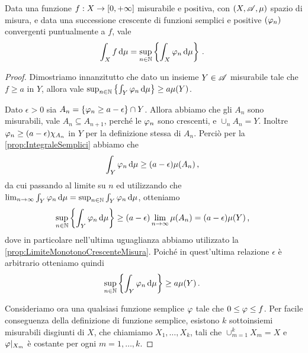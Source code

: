 \begin{proposition} \label{prop:DefinizioneEquivalenteIntegralePositive}
	Data una funzione $f:X\to[0,+\infty]$ misurabile e positiva, con $(X,\mathscr A,\mu)$ spazio di misura, e data una successione crescente di funzioni semplici e positive $(\varphi_n)$ convergenti puntualmente a $f$, vale 
	\begin{equation*}
		\int_X f\,\mathrm d\mu=\sup_{n\in\mathbb N}\left\{\int_X\varphi_n\,\mathrm d\mu\right\}\, \text{. }
	\end{equation*}
\end{proposition}
\begin{proof}
	Dimostriamo innanzitutto che dato un insieme $Y\in \mathscr A$ misurabile tale che $f\ge a$ in $Y$, allora vale $\sup_{n\in\mathbb N}\left\{\int_Y\varphi_n\,\mathrm d\mu\right\}\ge a\mu(Y)$.
	
	Dato $\epsilon>0$ sia $A_n=\{\varphi_n\ge a-\epsilon\}\cap Y$. Allora abbiamo che gli $A_n$ sono misurabili, vale $A_n\subseteq A_{n+1}$, perché le $\varphi_n$ sono crescenti, e $\cup_nA_n=Y$. Inoltre $\varphi_n\ge (a-\epsilon)\chi_{A_n}$ in $Y$ per la definizione stessa di $A_n$. Perciò per la \cref{prop:IntegraleSemplici} abbiamo che
	\begin{equation*}
		\int_Y\varphi_n\,\mathrm d\mu\ge(a-\epsilon)\mu(A_n)\, \text{, }
	\end{equation*}
	da cui passando al limite su $n$ ed utilizzando che $\lim_{n\to\infty}\int_Y\varphi_n\,\mathrm d\mu=\sup_{n\in\mathbb N}\int_Y\varphi_n\,\mathrm d\mu$, otteniamo
	\begin{equation*}
		\sup_{n\in\mathbb N}\left\{\int_Y\varphi_n\,\mathrm d\mu\right\}\ge(a-\epsilon)\lim_{n\to\infty}\mu(A_n)=(a-\epsilon)\mu(Y)\, \text{, }
	\end{equation*}
	dove in particolare nell'ultima uguaglianza abbiamo utilizzato la \cref{prop:LimiteMonotonoCrescenteMisura}. Poiché in quest'ultima relazione $\epsilon$ è arbitrario otteniamo quindi
	\begin{equation*}
		\sup_{n\in\mathbb N}\left\{\int_Y\varphi_n\,\mathrm d\mu\right\}\ge a\mu(Y)\, \text{. }
	\end{equation*}

	Consideriamo ora una qualsiasi funzione semplice $\varphi$ tale che $0\le \varphi\le f$. Per facile conseguenza della definizione di funzione semplice, esistono $k$ sottoinsiemi misurabili disgiunti di $X$, che chiamiamo $X_1,\dots,X_k$, tali che $\cup_{m=1}^kX_m=X$ e $\varphi|_{X_m}$ è costante per ogni $m=1,\dots,k$.
	

\end{proof}
